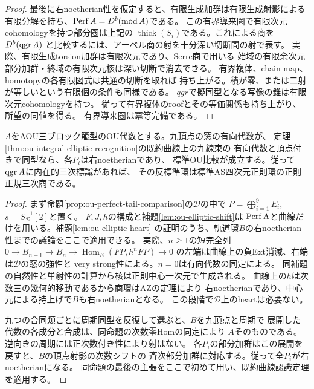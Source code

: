 \begin{proof}
最後に右noetherian性を仮定すると、有限生成加群は有限生成射影による
有限分解を持ち、$\operatorname{Perf} A=D^b(\operatorname{mod} A)$である。
この有界導来圏で有限次元cohomologyを持つ部分圏は上記の
$\operatorname{thick}(S_i)$である。これによる商を$D^b(\operatorname{qgr} A)$
と比較するには、アーベル商の射を十分深い切断間の射で表す。
実際、有限生成torsion加群は有限次元であり、Serre商で用いる
始域の有限余次元部分加群・終域の有限次元核は深い切断で消去できる。
有界複体、chain map、homotopyの各有限図式は共通の切断を取れば
持ち上がる。積が零、または二射が等しいという有限個の条件も同様である。
$qgr$で擬同型となる写像の錐は有限次元cohomologyを持つ。
従って有界複体のroofとその等価関係も持ち上がり、所望の同値を得る。
有界導来圏は冪等完備である。
\end{proof}

\begin{corollary}[既約曲線表示からの標準比較]
\label{cor:ou-integral-automatic-comparison}
$A$をAOU三ブロック箙型のOU代数とする。九頂点の窓の有向代数が、
定理\ref{thm:ou-integral-elliptic-recognition}の既約曲線上の九線束の
有向代数と頂点付きで同型なら、各$P_i$は右noetherianであり、
標準OU比較が成立する。従って$\operatorname{qgr} A$に内在的三次標識があれば、
その反標準環は標準AS四次元正則環の正則正規三次商である。
\end{corollary}
\begin{proof}
まず命題\ref{prop:ou-perfect-tail-comparison}の$\mathcal D$の中で
$P=\bigoplus_{i=1}^9 E_i$, $s=S_{\mathcal D}^{-1}[2]$と置く。
$F,J,h$の構成と補題\ref{lem:ou-elliptic-shift}は
$\operatorname{Perf}\Lambda$と曲線だけを用いる。補題\ref{lem:ou-elliptic-heart}
の証明のうち、軌道環$B$の右noetherian性までの議論をここで適用できる。
実際、$n\ge1$の短完全列
$0\to B_{n-1}\to B_n\to\operatorname{Hom}_E(FP,h^nFP)\to0$
の左端は曲線上の負Ext消滅、右端は$\mathcal D$の窓の強性と
very strong性による。$n=0$は有向代数の同定による。
同補題の自然性と単射性の計算から核は正則中心一次元で生成される。
曲線上の$h$は次数三の幾何的移動であるから商環はAZの定理により
右noetherianであり、中心元による持上げで$B$も右noetherianとなる。
この段階で$\mathcal D$上のheartは必要ない。

九つの合同類ごとに周期同型を反復して選ぶと、$B$を九頂点と周期で
展開した代数の各成分と合成は、同命題の次数零Homの同定により
$A$そのものである。逆向きの周期には正次数付き性により射はない。
各$P_i$の部分加群はこの展開を戻すと、$B$の頂点射影の次数シフトの
斉次部分加群に対応する。従って全$P_i$が右noetherianになる。
同命題の最後の主張をここで初めて用い、既約曲線認識定理を適用する。
\end{proof}

